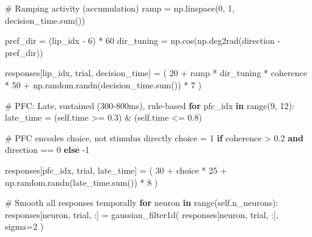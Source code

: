 \documentclass[
  11pt,
  letterpaper,
  oneside,
  openany]{book}
\newenvironment{Shaded}{\begin{snugshade}}{\end{snugshade}}
\newcommand{\BuiltInTok}[1]{\textcolor[rgb]{0.00,0.23,0.31}{#1}}
\newcommand{\CommentTok}[1]{\textcolor[rgb]{0.37,0.37,0.37}{#1}}
\newcommand{\ControlFlowTok}[1]{\textcolor[rgb]{0.00,0.23,0.31}{\textbf{#1}}}
\newcommand{\DecValTok}[1]{\textcolor[rgb]{0.68,0.00,0.00}{#1}}
\newcommand{\FloatTok}[1]{\textcolor[rgb]{0.68,0.00,0.00}{#1}}
\newcommand{\KeywordTok}[1]{\textcolor[rgb]{0.00,0.23,0.31}{\textbf{#1}}}
\newcommand{\NormalTok}[1]{\textcolor[rgb]{0.00,0.23,0.31}{#1}}
\newcommand{\OperatorTok}[1]{\textcolor[rgb]{0.37,0.37,0.37}{#1}}
\newcommand{\VariableTok}[1]{\textcolor[rgb]{0.07,0.07,0.07}{#1}}
\begin{document}
\begin{Shaded}
\begin{Highlighting}[]
                \CommentTok{\# Ramping activity (accumulation)}
\NormalTok{                ramp }\OperatorTok{=}\NormalTok{ np.linspace(}\DecValTok{0}\NormalTok{, }\DecValTok{1}\NormalTok{, decision\_time.}\BuiltInTok{sum}\NormalTok{())}
                
\NormalTok{                pref\_dir }\OperatorTok{=}\NormalTok{ (lip\_idx }\OperatorTok{{-}} \DecValTok{6}\NormalTok{) }\OperatorTok{*} \DecValTok{60}
\NormalTok{                dir\_tuning }\OperatorTok{=}\NormalTok{ np.cos(np.deg2rad(direction }\OperatorTok{{-}}\NormalTok{ pref\_dir))}
                
\NormalTok{                responses[lip\_idx, trial, decision\_time] }\OperatorTok{=}\NormalTok{ (}
                    \DecValTok{20} \OperatorTok{+}\NormalTok{ ramp }\OperatorTok{*}\NormalTok{ dir\_tuning }\OperatorTok{*}\NormalTok{ coherence }\OperatorTok{*} \DecValTok{50} \OperatorTok{+} 
\NormalTok{                    np.random.randn(decision\_time.}\BuiltInTok{sum}\NormalTok{()) }\OperatorTok{*} \DecValTok{7}
\NormalTok{                )}
            
            \CommentTok{\# PFC: Late, sustained (300{-}800ms), rule{-}based}
            \ControlFlowTok{for}\NormalTok{ pfc\_idx }\KeywordTok{in} \BuiltInTok{range}\NormalTok{(}\DecValTok{9}\NormalTok{, }\DecValTok{12}\NormalTok{):}
\NormalTok{                late\_time }\OperatorTok{=}\NormalTok{ (}\VariableTok{self}\NormalTok{.time }\OperatorTok{\textgreater{}=} \FloatTok{0.3}\NormalTok{) }\OperatorTok{\&}\NormalTok{ (}\VariableTok{self}\NormalTok{.time }\OperatorTok{\textless{}=} \FloatTok{0.8}\NormalTok{)}
                
                \CommentTok{\# PFC encodes choice, not stimulus directly}
\NormalTok{                choice }\OperatorTok{=} \DecValTok{1} \ControlFlowTok{if}\NormalTok{ coherence }\OperatorTok{\textgreater{}} \FloatTok{0.2} \KeywordTok{and}\NormalTok{ direction }\OperatorTok{==} \DecValTok{0} \ControlFlowTok{else} \OperatorTok{{-}}\DecValTok{1}
                
\NormalTok{                responses[pfc\_idx, trial, late\_time] }\OperatorTok{=}\NormalTok{ (}
                    \DecValTok{30} \OperatorTok{+}\NormalTok{ choice }\OperatorTok{*} \DecValTok{25} \OperatorTok{+}\NormalTok{ np.random.randn(late\_time.}\BuiltInTok{sum}\NormalTok{()) }\OperatorTok{*} \DecValTok{8}
\NormalTok{                )}
            
            \CommentTok{\# Smooth all responses temporally}
            \ControlFlowTok{for}\NormalTok{ neuron }\KeywordTok{in} \BuiltInTok{range}\NormalTok{(}\VariableTok{self}\NormalTok{.n\_neurons):}
\NormalTok{                responses[neuron, trial, :] }\OperatorTok{=}\NormalTok{ gaussian\_filter1d(}
\NormalTok{                    responses[neuron, trial, :], sigma}\OperatorTok{=}\DecValTok{2}
\NormalTok{                )}
        

\end{Highlighting}
\end{Shaded}
\end{document}
